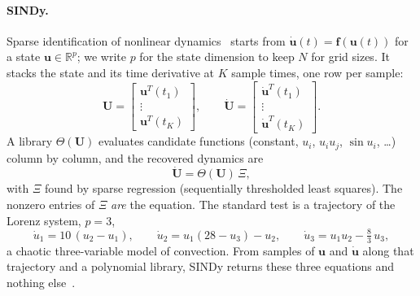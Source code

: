 \paragraph{SINDy.}
Sparse identification of nonlinear dynamics~\cite{Brunton2016} starts from
$\dot{\mathbf u}(t) = \mathbf f(\mathbf u(t))$ for a state
$\mathbf u\in\mathbb R^p$; we write $p$ for the state dimension to keep $N$ for
grid sizes. It stacks the state and its time derivative at $K$ sample times,
one row per sample:
\begin{equation}
  \mathbf U = \begin{bmatrix} \mathbf u^T(t_1) \\ \vdots \\ \mathbf u^T(t_K) \end{bmatrix},
  \qquad
  \dot{\mathbf U} = \begin{bmatrix} \dot{\mathbf u}^T(t_1) \\ \vdots \\ \dot{\mathbf u}^T(t_K) \end{bmatrix}.
  \label{eq:sindy-data}
\end{equation}%
A library $\Theta(\mathbf U)$ evaluates candidate functions (constant, $u_i$,
$u_iu_j$, $\sin u_i$, \dots) column by column, and the recovered dynamics are
\begin{equation}
  \dot{\mathbf U} = \Theta(\mathbf U)\,\Xi ,
  \label{eq:sindy}
\end{equation}%
with $\Xi$ found by sparse regression (sequentially thresholded least squares).
The nonzero entries of $\Xi$ \emph{are} the equation. The standard test is a
trajectory of the Lorenz system, $p = 3$,
\begin{equation*}
  \dot u_1 = 10\,(u_2 - u_1), \qquad
  \dot u_2 = u_1(28 - u_3) - u_2, \qquad
  \dot u_3 = u_1u_2 - \tfrac{8}{3}\,u_3 ,
\end{equation*}
a chaotic three-variable model of convection. From samples of $\mathbf u$ and
$\dot{\mathbf u}$ along that trajectory and a polynomial library, SINDy returns
these three equations and nothing else~\cite{Brunton2016}.

